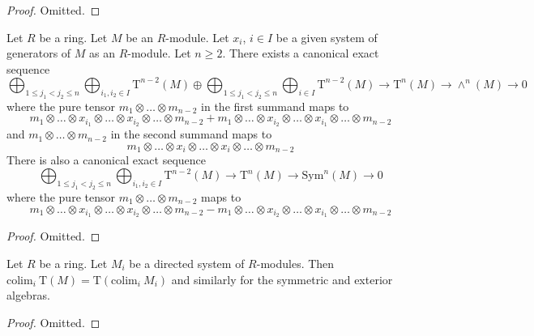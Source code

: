 \begin{proof}
Omitted.
\end{proof}

\begin{lemma}
\label{lemma-present-sym-wedge}
Let $R$ be a ring.
Let $M$ be an $R$-module.
Let $x_i$, $i \in I$ be a given system of generators of
$M$ as an $R$-module. Let $n \geq 2$.
There exists a canonical exact sequence
$$
\bigoplus_{1 \leq j_1 < j_2 \leq n}
\bigoplus_{i_1, i_2 \in I}
\text{T}^{n - 2}(M)
\oplus 
\bigoplus_{1 \leq j_1 < j_2 \leq n}
\bigoplus_{i \in I}
\text{T}^{n - 2}(M)
\to
\text{T}^n(M)
\to
\wedge^n(M)
\to
0
$$
where the pure tensor $m_1 \otimes \ldots \otimes m_{n - 2}$ in the first
summand maps to
$$
m_1 \otimes \ldots \otimes x_{i_1} \otimes \ldots
\otimes x_{i_2} \otimes \ldots \otimes m_{n - 2}
+
m_1 \otimes \ldots \otimes x_{i_2} \otimes \ldots
\otimes x_{i_1} \otimes \ldots \otimes m_{n - 2}
$$
and $m_1 \otimes \ldots \otimes m_{n - 2}$ in the second
summand maps to
$$
m_1 \otimes \ldots \otimes x_i \otimes \ldots
\otimes x_i \otimes \ldots \otimes m_{n - 2}
$$
There is also a canonical exact sequence
$$
\bigoplus_{1 \leq j_1 < j_2 \leq n}
\bigoplus_{i_1, i_2 \in I}
\text{T}^{n - 2}(M)
\to
\text{T}^n(M)
\to
\text{Sym}^n(M)
\to
0
$$
where the pure tensor $m_1 \otimes \ldots \otimes m_{n - 2}$ maps to
$$
m_1 \otimes \ldots \otimes x_{i_1} \otimes \ldots
\otimes x_{i_2} \otimes \ldots \otimes m_{n - 2}
-
m_1 \otimes \ldots \otimes x_{i_2} \otimes \ldots
\otimes x_{i_1} \otimes \ldots \otimes m_{n - 2}
$$
\end{lemma}

\begin{proof}
Omitted.
\end{proof}

\begin{lemma}
\label{lemma-colimit-tensor-algebra}
Let $R$ be a ring. Let $M_i$ be a directed system of
$R$-modules. Then
$\text{colim}_i\ \text{T}(M) = \text{T}(\text{colim}_i\ M_i)$
and similarly for the symmetric and exterior algebras.
\end{lemma}

\begin{proof}
Omitted.
\end{proof}




































